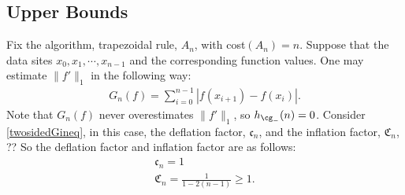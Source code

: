 \subsection{Upper Bounds}
 Fix the algorithm, trapezoidal rule, $A_n$, with cost$(A_n)=n$. Suppose that the data sites $x_0,x_1,\cdots, x_{n-1}$ and the corresponding function values. One may estimate $\|f'\|_1$ in the following way:
 \begin{align}\label{1direst}
    G_n(f)=\sum_{i=0}^{n-1}\left|f(x_{i+1})-f(x_{i})\right|.
 \end{align} Note that $G_{n}(f)$ never overestimates $\|f'\|_{1}$, so $h_{\cg_{-}}(n)=0$. Consider \eqref{twosidedGineq}, in this case, the deflation factor, $\mathfrak{c}_n$, and the inflation factor, $\mathfrak{C}_n$,
 ??
So the deflation factor and inflation factor are as follows:
\begin{gather}\label{factor}
\mathfrak{c}_n =1 \\%
\mathfrak{C}_n =\frac{1}{1 - 2(n-1)} \ge 1.
\end{gather}

